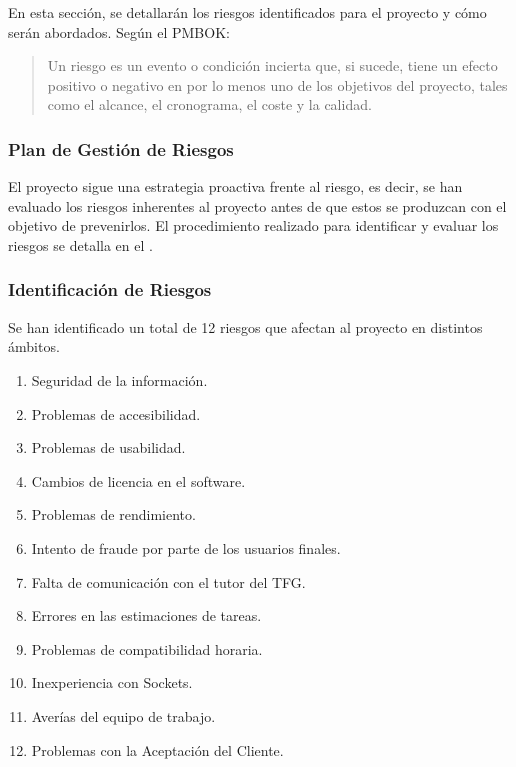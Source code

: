 En esta sección, se detallarán los riesgos identificados para el proyecto y cómo serán abordados. Según el PMBOK:
\begin{quote}
Un riesgo es un evento o condición incierta que, si sucede, tiene un efecto positivo o negativo en por lo menos uno de los objetivos del proyecto, tales como el alcance, el cronograma, el coste y la calidad. \cite{pmbok2013}
\end{quote}

\subsubsection{Plan de Gestión de Riesgos} 
El proyecto sigue una estrategia proactiva frente al riesgo, es decir, se han evaluado los riesgos inherentes al proyecto antes de que estos se produzcan con el objetivo de prevenirlos. El procedimiento realizado para identificar y evaluar los riesgos se detalla en el .


\subsubsection{Identificación de Riesgos}\label{Risks:identificacion_riesgos}
\hypertarget{Risks:identificacion_riesgos}{}
Se han identificado un total de 12 riesgos que afectan al proyecto en distintos ámbitos. 
\begin{enumerate}
    \item Seguridad de la información.
    \item Problemas de accesibilidad.
    \item Problemas de usabilidad.
    \item Cambios de licencia en el software.
    \item Problemas de rendimiento.
    \item Intento de fraude por parte de los usuarios finales.
    \item Falta de comunicación con el tutor del TFG.
    \item Errores en las estimaciones de tareas.
    \item Problemas de compatibilidad horaria.
    \item Inexperiencia con Sockets.
    \item Averías del equipo de trabajo.
    \item Problemas con la Aceptación del Cliente.
\end{enumerate}

